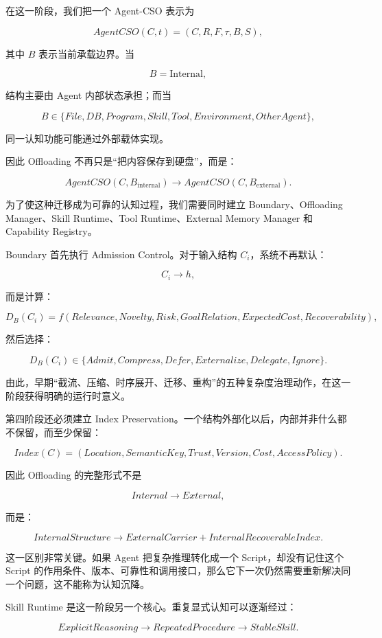 在这一阶段，我们把一个 Agent-CSO 表示为

\[
AgentCSO(C,t)
=
(C,R,F,\tau,B,S),
\]

其中 \(B\) 表示当前承载边界。当

\[
B=\mathrm{Internal},
\]

结构主要由 Agent 内部状态承担；而当

\[
B\in
\{
File,
DB,
Program,
Skill,
Tool,
Environment,
OtherAgent
\},
\]

同一认知功能可能通过外部载体实现。

因此 Offloading 不再只是“把内容保存到硬盘”，而是：

\[
AgentCSO(C,B_{\mathrm{internal}})
\rightarrow
AgentCSO(C,B_{\mathrm{external}}).
\]

为了使这种迁移成为可靠的认知过程，我们需要同时建立 Boundary、Offloading Manager、Skill Runtime、Tool Runtime、External Memory Manager 和 Capability Registry。

Boundary 首先执行 Admission Control。对于输入结构 \(C_i\)，系统不再默认：

\[
C_i\rightarrow h,
\]

而是计算：

\[
D_B(C_i)
=
f
\left(
Relevance,
Novelty,
Risk,
GoalRelation,
ExpectedCost,
Recoverability
\right),
\]

然后选择：

\[
D_B(C_i)
\in
\{
Admit,
Compress,
Defer,
Externalize,
Delegate,
Ignore
\}.
\]

由此，早期“截流、压缩、时序展开、迁移、重构”的五种复杂度治理动作，在这一阶段获得明确的运行时意义。

第四阶段还必须建立 Index Preservation。一个结构外部化以后，内部并非什么都不保留，而至少保留：

\[
Index(C)
=
(
Location,
SemanticKey,
Trust,
Version,
Cost,
AccessPolicy
).
\]

因此 Offloading 的完整形式不是

\[
Internal\to External,
\]

而是：

\[
InternalStructure
\rightarrow
ExternalCarrier
+
InternalRecoverableIndex.
\]

这一区别非常关键。如果 Agent 把复杂推理转化成一个 Script，却没有记住这个 Script 的作用条件、版本、可靠性和调用接口，那么它下一次仍然需要重新解决同一个问题，这不能称为认知沉降。

Skill Runtime 是这一阶段另一个核心。重复显式认知可以逐渐经过：

\[
ExplicitReasoning
\rightarrow
RepeatedProcedure
\rightarrow
StableSkill.
\]

